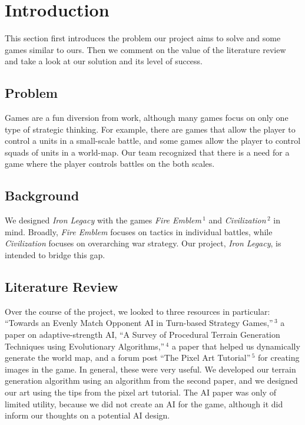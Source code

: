 \documentclass{article}
\begin{document}
\clearpage

\tableofcontents

\clearpage

\section*{Introduction}
This section first introduces the problem our project aims to solve and some
games similar to ours.
Then we comment on the value of the literature review and take a look at our
solution and its level of success.

\subsection*{Problem}
Games are a fun diversion from work, although many games focus on only one type
of strategic thinking.
For example, there are games that allow the player to control a units in a
small-scale battle, and some games allow the player to control
squads of units in a world-map.
Our team recognized that there is a need for a game where the player controls
battles on the both scales.

\subsection*{Background}
We designed \emph{Iron Legacy} with the games 
\emph{Fire Emblem}$\,^1$ and \emph{Civilization}$\,^2$ 
in mind.
Broadly, \emph{Fire Emblem} focuses on tactics in individual battles, while
\emph{Civilization} focuses on overarching war strategy.
Our project, \emph{Iron Legacy}, is intended to bridge this gap.

\subsection*{Literature Review}
Over the course of the project, we looked to three resources in particular:
``Towards an Evenly Match Opponent AI in Turn-based Strategy Games,''$\,^3$
a paper on adaptive-strength AI, 
``A Survey of Procedural Terrain Generation Techniques using Evolutionary 
Algorithms,''$\,^4$ a paper that helped us dynamically
generate the world map, and a forum post ``The Pixel Art 
Tutorial''$\,^5$ for creating images in the game.
In general, these were very useful.
We developed our terrain generation algorithm using an algorithm from the 
second paper, and we designed our art using the tips from the pixel art
tutorial.
The AI paper was only of limited utility, because we did not create an AI for
the game, although it did inform our thoughts on a potential AI design.
\end{document}
